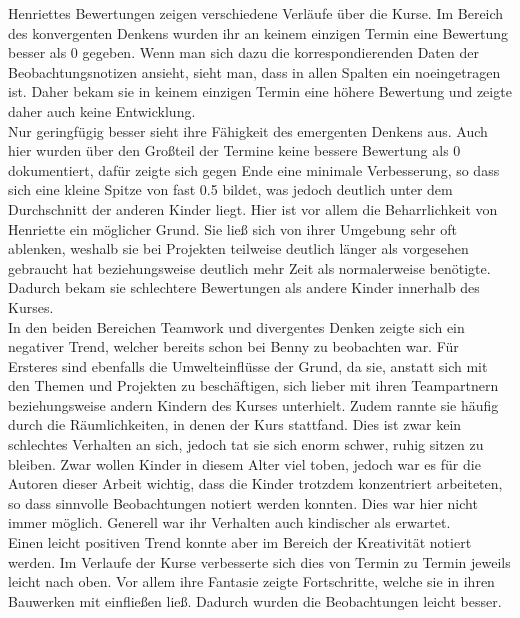 Henriettes Bewertungen zeigen verschiedene Verläufe über die Kurse. Im Bereich des konvergenten Denkens wurden ihr an keinem einzigen Termin eine Bewertung besser als 0 gegeben. Wenn man sich dazu die korrespondierenden Daten der Beobachtungsnotizen ansieht, sieht man, dass in allen Spalten ein \glqq no\grqq  eingetragen ist. Daher bekam sie in keinem einzigen Termin eine höhere Bewertung und zeigte daher auch keine Entwicklung.\\
Nur geringfügig besser sieht ihre Fähigkeit des emergenten Denkens aus. Auch hier wurden über den Großteil der Termine keine bessere Bewertung als 0 dokumentiert, dafür zeigte sich gegen Ende eine minimale Verbesserung, so dass sich eine kleine Spitze von fast 0.5 bildet, was jedoch deutlich unter dem Durchschnitt der anderen Kinder liegt. Hier ist vor allem die Beharrlichkeit von Henriette ein möglicher Grund. Sie ließ sich von ihrer Umgebung sehr oft ablenken, weshalb sie bei Projekten teilweise deutlich länger als vorgesehen gebraucht hat beziehungsweise deutlich mehr Zeit als normalerweise benötigte. Dadurch bekam sie schlechtere Bewertungen als andere Kinder innerhalb des Kurses. \\
In den beiden Bereichen Teamwork und divergentes Denken zeigte sich ein negativer Trend, welcher bereits schon bei Benny zu beobachten war. Für Ersteres sind ebenfalls die Umwelteinflüsse der Grund, da sie, anstatt sich mit den Themen und Projekten zu beschäftigen, sich lieber mit ihren Teampartnern beziehungsweise andern Kindern des Kurses unterhielt. Zudem rannte sie häufig durch die Räumlichkeiten, in denen der Kurs stattfand. Dies ist zwar kein schlechtes Verhalten an sich, jedoch tat sie sich enorm schwer, ruhig sitzen zu bleiben. Zwar wollen Kinder in diesem Alter viel toben, jedoch war es für die Autoren dieser Arbeit wichtig, dass die Kinder trotzdem konzentriert arbeiteten, so dass sinnvolle Beobachtungen notiert werden konnten. Dies war hier nicht immer möglich. Generell war ihr Verhalten auch kindischer als erwartet. \\
Einen leicht positiven Trend konnte aber im Bereich der Kreativität notiert werden. Im Verlaufe der Kurse verbesserte sich dies von Termin zu Termin jeweils leicht nach oben. Vor allem ihre Fantasie zeigte Fortschritte, welche sie in ihren Bauwerken mit einfließen ließ. Dadurch wurden die Beobachtungen leicht besser. 
